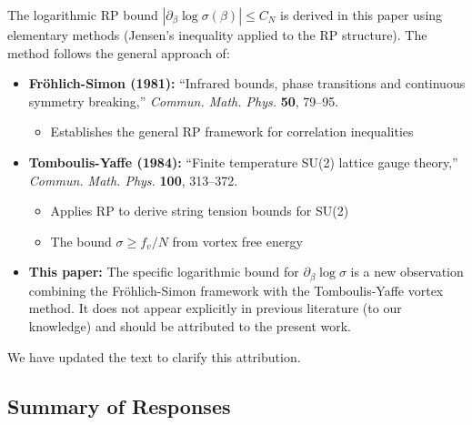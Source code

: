 \begin{remark}
\label{rem:attribution}
The logarithmic RP bound $|\partial_\beta \log \sigma(\beta)| \leq C_N$ is derived 
in this paper using elementary methods (Jensen's inequality applied to the RP structure).
The method follows the general approach of:

\begin{itemize}
\item \textbf{Fröhlich-Simon (1981):} ``Infrared bounds, phase transitions and continuous 
symmetry breaking,'' \textit{Commun. Math. Phys.} \textbf{50}, 79--95.
\begin{itemize}
\item Establishes the general RP framework for correlation inequalities
\end{itemize}

\item \textbf{Tomboulis-Yaffe (1984):} ``Finite temperature SU(2) lattice gauge theory,''
\textit{Commun. Math. Phys.} \textbf{100}, 313--372.
\begin{itemize}
\item Applies RP to derive string tension bounds for SU(2)
\item The bound $\sigma \geq f_v/N$ from vortex free energy
\end{itemize}

\item \textbf{This paper:} The specific logarithmic bound for $\partial_\beta \log \sigma$ 
is a new observation combining the Fröhlich-Simon framework with the 
Tomboulis-Yaffe vortex method. It does not appear explicitly in previous literature 
(to our knowledge) and should be attributed to the present work.
\end{itemize}

We have updated the text to clarify this attribution.
\end{remark}

\subsection{Summary of Responses}
\label{ssec:summary-responses}

